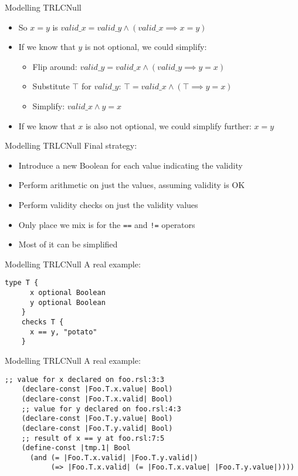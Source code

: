 \documentclass[aspectratio=169]{beamer}
\begin{document}
\begin{frame}{Modelling TRLC}{Null}
  \begin{itemize}
  \item So $x = y$ is
    $valid\_x = valid\_y \land (valid\_x \implies x = y)$
    \pause
  \item If we know that $y$ is not optional, we could simplify:
    \begin{itemize}
    \item Flip around:
      $valid\_y = valid\_x \land (valid\_y \implies y = x)$
      \pause
    \item Substitute $\top$ for $valid\_y$:
      $\top = valid\_x \land (\top \implies y = x)$
      \pause
    \item Simplify:
      $valid\_x \land y = x$
    \end{itemize}
    \pause
  \item If we know that $x$ is also not optional, we could simplify
    further: $x = y$
  \end{itemize}
\end{frame}

\begin{frame}{Modelling TRLC}{Null}
  Final strategy:
  \begin{itemize}
  \item Introduce a new Boolean for each value indicating the validity
  \item Perform arithmetic on just the values, assuming validity is OK
  \item Perform validity checks on just the validity values
  \item Only place we mix is for the {\tt ==} and {\tt !=} operators
  \item Most of it can be simplified
  \end{itemize}
\end{frame}

\begin{frame}[fragile]{Modelling TRLC}{Null}
  A real example:
  \begin{lstlisting}[language=TRLC,gobble=4]
    type T {
      x optional Boolean
      y optional Boolean
    }
    checks T {
      x == y, "potato"
    }
  \end{lstlisting}
\end{frame}

\begin{frame}[fragile]{Modelling TRLC}{Null}
  A real example:
  \begin{lstlisting}[language=SMTLIB,gobble=4]
    ;; value for x declared on foo.rsl:3:3
    (declare-const |Foo.T.x.value| Bool)
    (declare-const |Foo.T.x.valid| Bool)
    ;; value for y declared on foo.rsl:4:3
    (declare-const |Foo.T.y.value| Bool)
    (declare-const |Foo.T.y.valid| Bool)
    ;; result of x == y at foo.rsl:7:5
    (define-const |tmp.1| Bool
      (and (= |Foo.T.x.valid| |Foo.T.y.valid|)
           (=> |Foo.T.x.valid| (= |Foo.T.x.value| |Foo.T.y.value|))))
  \end{lstlisting}
\end{frame}
\end{document}
